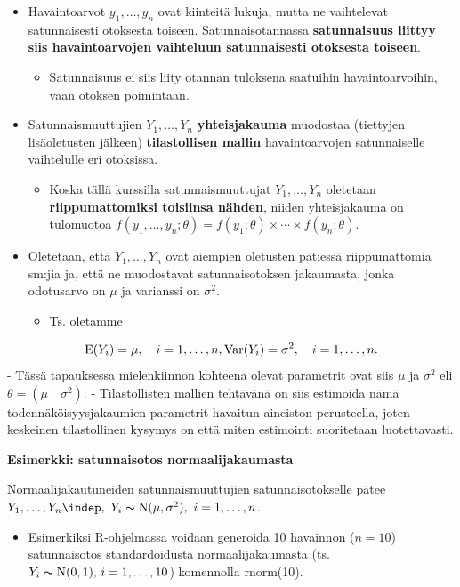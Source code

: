 \documentclass[
]{book}
\providecommand{\tightlist}{%
  \setlength{\itemsep}{0pt}\setlength{\parskip}{0pt}}
\begin{document}
\begin{itemize}
\tightlist
\item
  Havaintoarvot \(y_1, \ldots, y_n\) ovat kiinteitä lukuja, mutta ne vaihtelevat satunnaisesti otoksesta toiseen. Satunnaisotannassa \textbf{satunnaisuus liittyy siis havaintoarvojen vaihteluun satunnaisesti otoksesta toiseen}.

  \begin{itemize}
  \tightlist
  \item
    Satunnaisuus ei siis liity otannan tuloksena saatuihin havaintoarvoihin, vaan otoksen poimintaan.
  \end{itemize}
\item
  Satunnaismuuttujien \(Y_1, \ldots, Y_n\) \textbf{yhteisjakauma} muodostaa (tiettyjen lisäoletusten jälkeen) \textbf{tilastollisen mallin} havaintoarvojen satunnaiselle vaihtelulle eri otoksissa.

  \begin{itemize}
  \tightlist
  \item
    Koska tällä kurssilla satunnaismuuttujat \(Y_1, \ldots, Y_n\) oletetaan \textbf{riippumattomiksi toisiinsa nähden}, niiden yhteisjakauma on tulomuotoa \(f(y_1, \ldots, y_n; \theta) = f(y_1; \theta) \times \cdots \times f(y_n; \theta)\).
  \end{itemize}
\item
  Oletetaan, että \(Y_1, \ldots, Y_n\) ovat aiempien oletusten pätiessä riippumattomia sm:jia ja, että ne muodostavat satunnaisotoksen jakaumasta, jonka odotusarvo on \(\mu\) ja varianssi on \(\sigma^2\).

  \begin{itemize}
  \tightlist
  \item
    Ts. oletamme
  \end{itemize}
\end{itemize}

\[
\text{E}(Y_i) = \mu, \quad i=1,\ldots,n,  \\
\mathrm{Var}(Y_i) = \sigma^2, \quad i=1,\ldots,n.
\]
- Tässä tapauksessa mielenkiinnon kohteena olevat parametrit ovat siis \(\mu\) ja \(\sigma^2\) eli \(\theta = (\mu \quad \sigma^2)\).
- Tilastollisten mallien tehtävänä on siis estimoida nämä todennäköisyysjakaumien parametrit havaitun aineiston perusteella, joten keskeinen tilastollinen kysymys on että miten estimointi suoritetaan luotettavasti.

\begin{eblock}{}

\textbf{Esimerkki: satunnaisotos normaalijakaumasta}

Normaalijakautuneiden satunnaismuuttujien satunnaisotokselle pätee \(Y_1, \ldots, Y_n \indep, \,\, Y_i \thicksim \text{N}(\mu, \sigma^2),\,\, i=1,\ldots,n\).

\begin{itemize}
\tightlist
\item
  Esimerkiksi R-ohjelmassa voidaan generoida 10 havainnon (\(n=10\)) satunnaisotos standardoidusta normaalijakaumasta (ts. \(Y_i \thicksim \text{N}(0,1),\, i=1,\ldots,10\)) komennolla rnorm(10).
\end{itemize}

\end{eblock}
\end{document}
